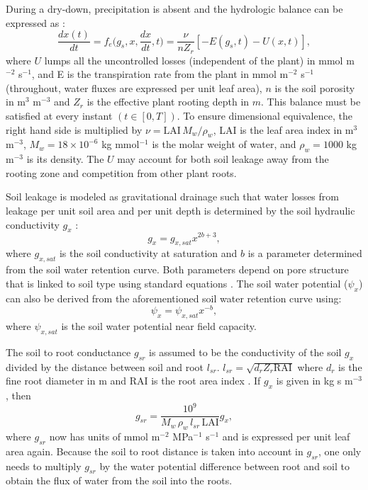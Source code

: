 \documentclass[utf8]{frontiersSCNS} %
\begin{document}
During a dry-down, precipitation is absent and the hydrologic balance can be expressed as \citep{rodriguez-iturbe_ecohydrology_2007}:
\begin{equation}
    \label{eqn:soil_water}
    \frac{dx(t)}{dt} = f_e\Big(g_s, x, \frac{dx}{dt}, t\Big) = \frac{\nu}{ n Z_r}[- E(g_s, t) - U(x, t)],
\end{equation}
where $U$ lumps all the uncontrolled losses (independent of the plant) in mmol m$^{-2}$ s$^{-1}$, and E is the transpiration rate from the plant in mmol m$^{-2}$ s$^{-1}$ (throughout, water fluxes are expressed per unit leaf area),  $n$ is the soil porosity in m$^3$ m$^{-3}$ and $Z_r$ is the effective plant rooting depth in $m$. This balance must be satisfied at every instant $(t \in [0,T])$.  To ensure dimensional equivalence, the right hand side is multiplied by $\nu = \text{LAI} \, M_w/ \rho_w$, LAI is the leaf area index in m$^3$ m$^{-3}$, $M_w = 18 \times 10^{-6}$ kg mmol$^{-1}$ is the molar weight of water, and $\rho_w = 1000$ kg m$^{-3}$ is its density. The $U$ may account for both soil leakage away from the rooting zone and competition from other plant roots.  

Soil leakage is modeled as gravitational drainage such that water losses from leakage per unit soil area and per unit depth is determined by the soil hydraulic conductivity $g_x$ \citep{campbell_introduction_2012}:
\begin{equation}
    \label{eqn:soil_cond}
    g_x = g_{x,sat}x^{2b+3},
\end{equation}
where $g_{x,sat}$ is the soil conductivity at saturation and $b$ is a parameter determined from the soil water retention curve. Both parameters depend on pore structure that is linked to soil type using standard equations \citep{clapp_empirical_1978}. The soil water potential ($\psi_x$) can also be derived from the aforementioned soil water retention curve using:
\begin{equation}
    \label{eqn:Clapp_pot}
    \psi_x = \psi_{x,sat}x^{-b},
\end{equation}
where $\psi_{x,sat}$ is the soil water potential near field capacity.

The soil to root conductance $g_{sr}$ is assumed to be the conductivity of the soil $g_x$ divided by the distance between soil and root $l_{sr}$. $l_{sr} = \sqrt{d_r Z_r \text{RAI}}$ where $d_r$ is the fine root diameter in m and RAI is the root area index \citep{manzoni_optimization_2013}. If $g_x$ is given in kg s m$^{-3}$, then
\begin{equation}
    \label{eqn:soil_root}
    g_{sr} = \frac{10^9}{M_w \, \rho_w \, l_{sr} \, \text{LAI}} g_x, 
\end{equation}
where $g_{sr}$ now has units of mmol m$^{-2}$ MPa$^{-1}$ s$^{-1}$ and is expressed per unit leaf area again. Because the soil to root distance is taken into account in $g_{sr}$, one only needs to multiply $g_{sr}$ by the water potential difference between root and soil to obtain the flux of water from the soil into the roots.
\end{document}

